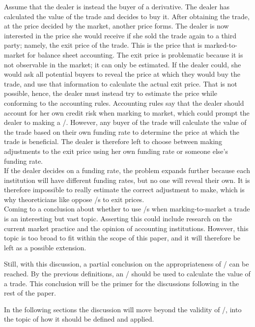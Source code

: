 \documentclass[main.tex]{subfiles}
\begin{document}
    Assume that the dealer is instead the buyer of a derivative.
    The dealer has calculated the value of the trade and decides to buy it.
    After obtaining the trade, at the price decided by the market, another price forms. 
    The dealer is now interested in the price she would receive 
    if she sold the trade again to a third party; namely, the exit price of the trade.
    This is the price that is marked-to-market for balance sheet accounting.
    The exit price is problematic because it is not observable in the market; 
    it can only be estimated.
    If the dealer could, she would ask all potential buyers to reveal the price 
    at which they would buy the trade, and use that information to calculate the actual exit price.
    That is not possible, hence, the dealer must instead try to estimate the price
    while conforming to the accounting rules.
    Accounting rules say that the dealer should account for her own credit risk 
    when marking to market, which could prompt the dealer to making a \DVA/.
    However, any buyer of the trade will calculate the value of the trade
    based on their own funding rate to determine the price at which the trade is beneficial.
    The dealer is therefore left to choose between making adjustments to the exit price
    using her own funding rate or someone else's funding rate.
    \\
    If the dealer decides on a funding rate, the problem expands further
    because each institution will have different funding rates, but no one will reveal their own.
    It is therefore impossible to really estimate the correct adjustment to make,
    which is why theoreticians like \textcite{HullWhite2012FVA} oppose \FVA/s to exit prices.
    \\
    Coming to a conclusion about whether to use \FVA/s when marking-to-market a trade
    is an interesting but vast topic.
    Asserting this could include research on the current market practice and
    the opinion of accounting institutions.
    However, this topic is too broad to fit within the scope of this paper,
    and it will therefore be left as a possible extension.

    Still, with this discussion, 
    a partial conclusion on the appropriateness of \FVA/ can be reached.
    By the previous definitions, an \FVA/ should be used to calculate the value of a trade.
    This conclusion will be the primer for the discussions following in the rest of the paper.
    
    In the following sections the discussion will move beyond the validity of \FVA/,
    into the topic of how it should be defined and applied.
    
\end{document}
